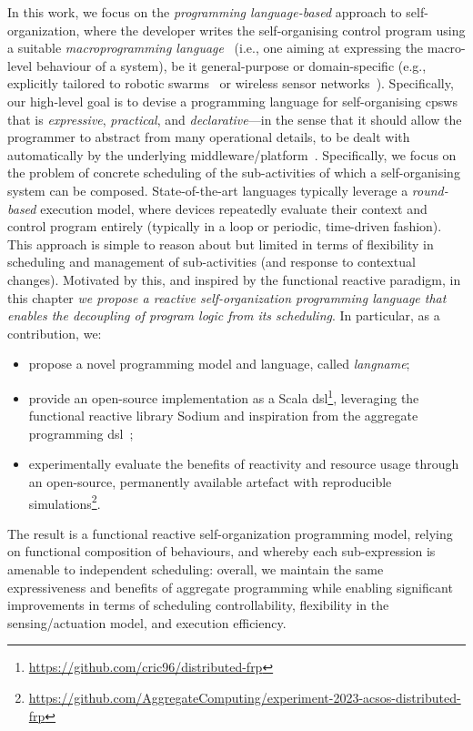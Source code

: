 In this work, we focus on the \emph{programming language-based} approach to self-organization,
 where the developer writes the self-organising control program
 using a suitable \emph{macroprogramming language}~\cite{casadei2023macro,DBLP:journals/jisa/JuniorSBP21} (i.e., one aiming at expressing the macro-level behaviour of a system), be it general-purpose or domain-specific (e.g., explicitly tailored to robotic swarms~\cite{DBLP:journals/swarm/BrambillaFBD13} or wireless sensor networks~\cite{DBLP:journals/csur/MottolaP11}).
%
Specifically, our high-level goal
 is to devise a programming language
 for self-organising \acp{cpsw}
 that is \emph{expressive}, \emph{practical},
 and \emph{declarative}---in the sense that it should allow the programmer to abstract from
many operational details, to be dealt with automatically by the underlying middleware/platform~\cite{DBLP:conf/iotdi/NoorTGS19}.
%
Specifically, we focus on the problem of concrete scheduling of the sub-activities of which a self-organising system can be composed.
%
State-of-the-art languages typically leverage a \emph{round-based} execution model,
 where devices repeatedly evaluate their context and control program entirely
(typically in a loop or periodic, time-driven fashion).
%
This approach is simple to reason about but
 limited in terms of flexibility in scheduling
 and management of sub-activities (and response to contextual changes).
%
Motivated by this, and inspired by the functional reactive paradigm,
 in this chapter 
 \emph{we propose a reactive self-organization programming language
 that enables the decoupling of program logic from its scheduling}.
% 
In particular, as a contribution, we:
\begin{itemize}
\item propose a novel programming model and language, called \emph{\ac{langname}};
\item provide an open-source implementation as a Scala \ac{dsl}\footnote{\label{acsos2023-frp:footnote:dsl}\url{https://github.com/cric96/distributed-frp}},
 leveraging the functional reactive library Sodium and 
 inspiration from the \scafi{} aggregate programming \ac{dsl}~\cite{DBLP:journals/softx/CasadeiVAP22,DBLP:journals/lmcs/AudritoCDV23};
\item experimentally evaluate the benefits of reactivity and resource usage
through an open-source, permanently available artefact with reproducible simulations\footnote{\label{acsos2023-frp:footnote:eval}\url{https://github.com/AggregateComputing/experiment-2023-acsos-distributed-frp}}.
\end{itemize}
%
The result is a functional reactive self-organization programming model, 
 relying on functional composition of behaviours,
and whereby each sub-expression is amenable to independent scheduling:
 overall, we maintain the same expressiveness and benefits of aggregate programming
 while enabling significant improvements in terms of scheduling controllability, flexibility in the sensing/actuation model, and execution efficiency. %
 
